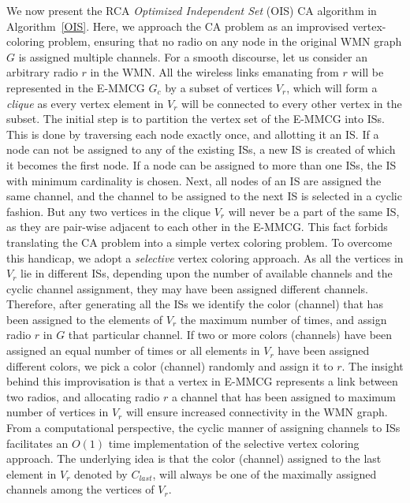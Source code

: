 \documentclass[conference]{IEEEtran}
\begin{document}
We now present the RCA \textit{Optimized Independent Set} (OIS) CA algorithm in Algorithm~\ref{OIS}. Here, we approach the CA problem as an improvised vertex-coloring problem, ensuring that no radio on any node in the original WMN graph $G$ is assigned multiple channels. For a smooth discourse, let us consider an arbitrary radio $r$ in the WMN. All the wireless links emanating from $r$ will be represented in the E-MMCG $G_c$ by a subset of vertices $V_r$, which will form a \textit{clique} as every vertex element in $V_r$ will be connected to every other vertex in the subset. The initial step is to partition the vertex set of the E-MMCG into ISs. This is done by traversing each node exactly once, and allotting it an IS. If a node can not be assigned to any of the existing ISs, a new IS is created of which it becomes the first node. If a node can be assigned to more than one ISs, the IS with minimum cardinality is chosen. Next, all nodes of an IS are assigned the same channel, and the channel to be assigned to 
the next IS is 
selected in a cyclic fashion. But any two vertices in the clique $V_r$ will never be a part of the same IS, as they are pair-wise adjacent to each other in the E-MMCG. This fact forbids translating the CA problem into a simple vertex coloring problem. To overcome this handicap, we adopt a \textit{selective} vertex coloring approach. As all the vertices in $V_r$ lie in different ISs, depending upon the number of available channels and the cyclic channel assignment, they may have been assigned different channels. Therefore, after generating all the ISs we identify the color (channel) that has been assigned to the elements of $V_r$ the maximum number of times, and assign radio $r$ in $G$ that particular channel. If two or more colors (channels) have been assigned an equal number of times or all elements in $V_r$ have been assigned different colors, we pick a color (channel) randomly and assign it to $r$. The insight behind this improvisation is that a vertex in E-MMCG represents a link between two radios, and 
allocating radio $r$ a channel that has been assigned to maximum number of vertices in $V_r$ will ensure increased connectivity in the WMN graph. From a computational perspective, the cyclic manner of assigning channels to ISs facilitates an $O(1)$ time implementation of the selective vertex coloring approach. The underlying idea is that the color (channel) assigned to the last element in $V_r$ denoted by $C_{last}$, will always be one of the maximally assigned channels among the vertices of  $V_r$.\\
\end{document}
